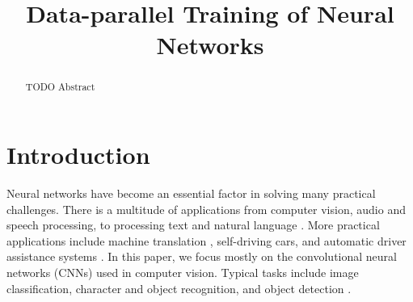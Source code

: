 \documentclass[conference,compsoc,a4paper]{IEEEtran}
\begin{document}
\title{Data-parallel Training of Neural Networks}


\author{
}


\maketitle

\begin{abstract}
TODO Abstract
\end{abstract}

\section{Introduction} %
\label{sec:introduction}
%
%

Neural networks have become an essential factor in solving many practical challenges.
There is a multitude of applications from computer vision, audio and speech processing, to processing text and natural language \cite{chen2016-Revisiting-distributed-synchronous-SGD,dean2012-Large-scale-distributed,yadan2013-Multi-GPU-Training}.
More practical applications include machine translation \cite{sutskever2014sequence}, self-driving cars, and automatic driver assistance systems \cite{jin2016-How-to-scale}.
%
In this paper, we focus mostly on the convolutional neural networks (CNNs) used in computer vision.
Typical tasks include image classification, character and object recognition, and object detection \cite{paine2013-GPU-async-SGD}.
\end{document}
